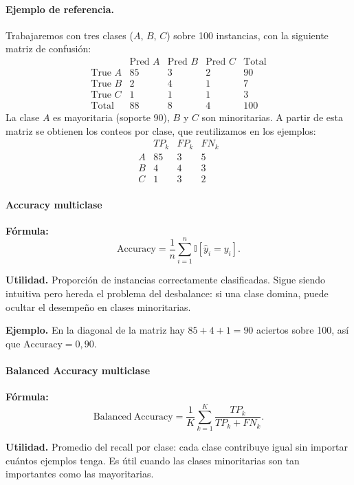 \documentclass[12pt,oneside]{report}
\newcommand{\ind}{\mathbb{I}} %
\begin{document}
\paragraph{Ejemplo de referencia.} Trabajaremos con tres clases ($A$,
$B$, $C$) sobre 100 instancias, con la siguiente matriz de confusión:
\[
\begin{array}{l|ccc|c}
 & \text{Pred }A & \text{Pred }B & \text{Pred }C & \text{Total} \\
\hline
\text{True }A & 85 & 3 & 2 & 90 \\
\text{True }B & 2  & 4 & 1 & 7  \\
\text{True }C & 1  & 1 & 1 & 3  \\
\hline
\text{Total} & 88 & 8 & 4 & 100
\end{array}
\]
La clase $A$ es mayoritaria (soporte 90), $B$ y $C$ son minoritarias.
A partir de esta matriz se obtienen los conteos por clase, que
reutilizamos en los ejemplos:
\[
\begin{array}{l|ccc}
 & TP_k & FP_k & FN_k \\
\hline
A & 85 & 3 & 5 \\
B & 4  & 4 & 3 \\
C & 1  & 3 & 2
\end{array}
\]

\paragraph{Accuracy multiclase}

\textbf{Fórmula:}
\[
\mathrm{Accuracy}=\frac{1}{n}\sum_{i=1}^{n}\ind[\hat y_i=y_i].
\]

\textbf{Utilidad.} Proporción de instancias correctamente clasificadas.
Sigue siendo intuitiva pero hereda el problema del desbalance: si una
clase domina, puede ocultar el desempeño en clases minoritarias.

\textbf{Ejemplo.} En la diagonal de la matriz hay $85+4+1=90$ aciertos
sobre 100, así que $\mathrm{Accuracy}=0{,}90$.

\paragraph{Balanced Accuracy multiclase}

\textbf{Fórmula:}
\[
\mathrm{Balanced\ Accuracy}=\frac{1}{K}\sum_{k=1}^{K}\frac{TP_k}{TP_k+FN_k}.
\]

\textbf{Utilidad.} Promedio del recall por clase: cada clase contribuye
igual sin importar cuántos ejemplos tenga. Es útil cuando las clases
minoritarias son tan importantes como las mayoritarias.
\end{document}
